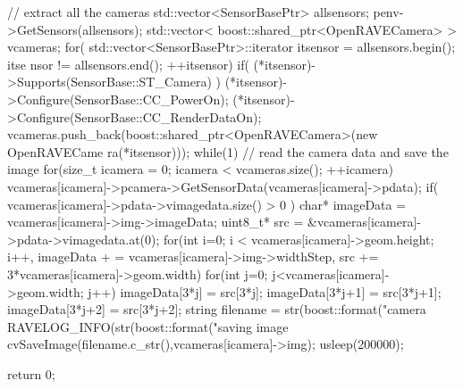 \begin{DoxyCodeInclude}
{    // extract all the cameras
    std::vector<SensorBasePtr> allsensors;
    penv->GetSensors(allsensors);
    std::vector< boost::shared_ptr<OpenRAVECamera> > vcameras;
    for( std::vector<SensorBasePtr>::iterator itsensor = allsensors.begin(); itse
      nsor != allsensors.end(); ++itsensor) {
        if( (*itsensor)->Supports(SensorBase::ST_Camera) ) {
            (*itsensor)->Configure(SensorBase::CC_PowerOn);
            (*itsensor)->Configure(SensorBase::CC_RenderDataOn);
            vcameras.push_back(boost::shared_ptr<OpenRAVECamera>(new OpenRAVECame
      ra(*itsensor)));
        }
    }
    while(1) {
        // read the camera data and save the image
        for(size_t icamera = 0; icamera < vcameras.size(); ++icamera) {
            vcameras[icamera]->pcamera->GetSensorData(vcameras[icamera]->pdata);
            if( vcameras[icamera]->pdata->vimagedata.size() > 0 ) {
                char* imageData = vcameras[icamera]->img->imageData;
                uint8_t* src = &vcameras[icamera]->pdata->vimagedata.at(0);
                for(int i=0; i < vcameras[icamera]->geom.height; i++, imageData +
      = vcameras[icamera]->img->widthStep, src += 3*vcameras[icamera]->geom.width) {
                    for(int j=0; j<vcameras[icamera]->geom.width; j++) {
                        imageData[3*j] = src[3*j];
                        imageData[3*j+1] = src[3*j+1];
                        imageData[3*j+2] = src[3*j+2];
                    }
                }
                string filename = str(boost::format("camera%
                RAVELOG_INFO(str(boost::format("saving image %
                cvSaveImage(filename.c_str(),vcameras[icamera]->img);
            }
        }
        usleep(200000);
    }

    return 0;
}
\end{DoxyCodeInclude}
 